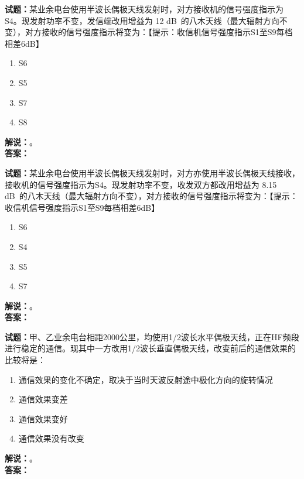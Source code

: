 \documentclass{ctexbook}
\begin{document}
\bigskip




\noindent\textbf{试题：}某业余电台使用半波长偶极天线发射时，对方接收机的信号强度指示为S4。现发射功率不变，发信端改用增益为 12 \unit[qualifier-mode=combine]{\deci\bel{}}的八木天线（最大辐射方向不变），对方接收的信号强度指示将变为：【提示：收信机信号强度指示S1至S9每档相差6dB】
\begin{enumerate}[leftmargin=3em]
\item S6
\item S5
\item S7
\item S8
\end{enumerate}
\noindent\textbf{解说：}\textbf{}。\\\noindent\textbf{答案：}

\bigskip




\noindent\textbf{试题：}某业余电台使用半波长偶极天线发射时，对方亦使用半波长偶极天线接收，接收机的信号强度指示为S4。现发射功率不变，收发双方都改用增益为 8.15 \unit[qualifier-mode=combine]{\deci\bel{}}的八木天线（最大辐射方向不变），对方接收的信号强度指示将变为：【提示：收信机信号强度指示S1至S9每档相差6dB】
\begin{enumerate}[leftmargin=3em]
\item S6
\item S4
\item S5
\item S7
\end{enumerate}
\noindent\textbf{解说：}\textbf{}。\\\noindent\textbf{答案：}

\bigskip




\noindent\textbf{试题：}甲、乙业余电台相距2000公里，均使用1/2波长水平偶极天线，正在HF频段进行稳定的通信。现其中一方改用1/2波长垂直偶极天线，改变前后的通信效果的比较将是：
\begin{enumerate}[leftmargin=3em]
\item 通信效果的变化不确定，取决于当时天波反射途中极化方向的旋转情况
\item 通信效果变差
\item 通信效果变好
\item 通信效果没有改变
\end{enumerate}
\noindent\textbf{解说：}\textbf{}。\\\noindent\textbf{答案：}

\bigskip
\end{document}
